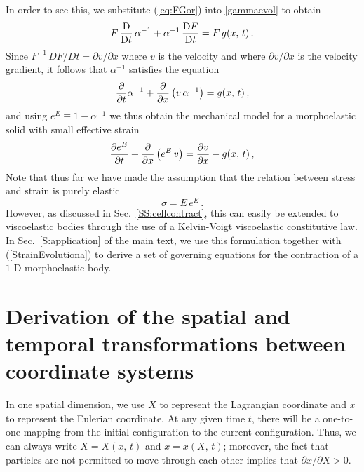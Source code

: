 In order to see this, we substitute (\ref{eq:FGor}) into \eqref{gammaevol} to obtain
\begin{equation}
 F \, \frac{\mathrm{D} }{\mathrm{D} t} \, \alpha^{-1} + \alpha^{-1} \, \frac{\mathrm{D} F}{\mathrm{D} t} = F \, g(x,\,t)\,. \label{AlphaEvolTemp}
\end{equation}
Since $F^{-1} \, D F/D t = \partial v/\partial x$
where $v$ is the velocity and where $\partial v/\partial x$ is the velocity gradient, it follows that $\alpha^{-1}$ satisfies the equation
\begin{equation*}
 \frac{\partial }{\partial t} \alpha^{-1} + \frac{\partial }{\partial x} \left(v \, \alpha^{-1}\right) = g(x,\,t)\,, \label{AlphaInvEvol}
\end{equation*}
and using $e^{E} \equiv 1 - \alpha^{-1}$ we thus obtain the mechanical model for a morphoelastic solid with small effective strain
\begin{equation}
\label{StrainEvolutiona}
\frac{\partial e^E}{\partial t} + \frac{\partial }{\partial x} \left(e^E \, v \right)  = \frac{\partial v}{\partial x} - g(x,\,t)\,,
\end{equation}
Note that thus far we have made the assumption that the relation between stress and strain is purely elastic
\begin{equation*}
\label{StrainEvolutionb}
\sigma = E \, e^E\,.
\end{equation*}
However, as discussed in Sec.~\ref{SS:cellcontract}, this can easily be extended to viscoelastic bodies through the use of a Kelvin-Voigt viscoelastic constitutive law. In Sec.~\ref{S:application} of the main text, we use this formulation together with (\ref{StrainEvolutiona}) to derive a set of governing equations for the contraction of a $1$-D morphoelastic body.


\section{Derivation of the spatial and temporal transformations between coordinate systems}
\label{sec:AppTransf}

In one spatial dimension, we use $X$ to represent the Lagrangian coordinate and $x$ to represent the Eulerian coordinate. At any given time $t$, there will be a one-to-one mapping from the initial configuration to the current configuration. Thus, we can always write $X = X(x,\,t)$ and $x = x(X,\,t)$; moreover, the fact that particles are not permitted to move through each other implies that ${\partial x}/{\partial X} > 0$.

